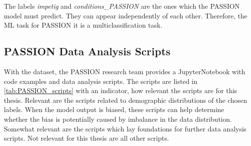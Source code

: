 \documentclass[12pt, a4paper, oneside]{book}   	%
\begin{document}
				The labels \textit{impetig} and \textit{conditions\_PASSION} are the ones which the PASSION model must predict. They can appear independently of each other. Therefore, the ML task for PASSION it is a multiclassification task.
			
			\subsection{PASSION Data Analysis Scripts}
				With the dataset, the PASSION research team provides a \gls{JupyterNotebook} with code examples and data analysis scripts. The scripts are listed in \autoref{tab:PASSION_scripts} with an indicator, how relevant the scripts are for this thesis. Relevant are the scripts related to demographic distributions of the chosen labels. When the model output is biased, these scripts can help determine whether the bias is potentially caused by imbalance in the data distribution. Somewhat relevant are the scripts which lay foundations for further data analysis scripts. Not relevant for this thesis are all other scripts.
				
\end{document}
